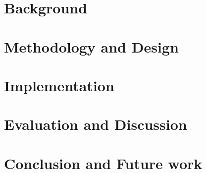 \documentclass[a4paper,10pt,twoside]{report}
\begin{document}
\clearpage

\chapter{Background}\label{ch:background}


\clearpage

\chapter{Methodology and Design}\label{ch:methodology}


\clearpage

\chapter{Implementation}\label{ch:implementation}


\clearpage

\chapter{Evaluation and Discussion}\label{ch:discussion}


\clearpage

\chapter{Conclusion and Future work}\label{ch:conclusion}


\clearpage






\clearpage

\renewcommand\chaptername{Appendix}
\begin{appendices}

\end{appendices}
\end{document}
